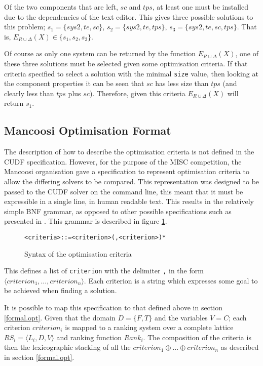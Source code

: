 Of the two components that are left, $sc$ and $tps$, at least one must be installed due to the dependencies of the text editor.
This gives three possible solutions to this problem;
$s_1 = \{sys2, te, sc\}$,
$s_2 = \{sys2, te, tps\}$,
$s_3 = \{sys2, te, sc, tps\}$.
That is, $E_{R \cup \Delta}(X) \in \{s_1,s_2,s_3\}$.

Of course as only one system can be returned by the function $E_{R \cup \Delta}(X)$, one of these three solutions must be selected given some optimisation criteria.
If that criteria specified to select a solution with the minimal \verb+size+ value, 
then looking at the component properties it can be seen that $sc$ has less size than $tps$ (and clearly less than $tps$ plus $sc$).
Therefore, given this criteria $E_{R \cup \Delta}(X)$ will return  $s_1$.

\subsection{Mancoosi Optimisation Format}
The description of how to describe the optimisation criteria is not defined in the CUDF specification.
However, for the purpose of the MISC competition, 
the Mancoosi organisation gave a specification to represent optimisation criteria to allow the differing solvers to be compared.
This representation was designed to be passed to the CUDF solver on the command line, this meant that it must be expressible in a single line, in human readable text.
This results in the relatively simple BNF grammar, as opposed to other possible specifications such as presented in \cite{treinen2009}. 
This grammar is described in figure \ref{formal.optbnf}.

\begin{figure}[h!]
\begin{center}
\begin{alltt}
<criteria> ::= <criterion> (, <criterion>)*
\end{alltt}
  \caption{Syntax of the optimisation criteria}
  \label{formal.optbnf}
\end{center}
\end{figure}

This defines a list of \verb+criterion+ with the delimiter \verb+,+ in the form $\langle criterion_1, \ldots, criterion_n \rangle$.
Each criterion is a string which expresses some goal to be achieved when finding a solution.

It is possible to map this specification to that defined above in section \ref{formal.opt}.
Given that the domain $D = \{F,T\}$ and the variables $V = C$;
each criterion $criterion_i$ is mapped to a ranking system over a complete lattice $RS_i = \langle L_i,D,V \rangle$
and ranking function $Rank_i$.
The composition of the criteria is then the lexicographic stacking of all the $criterion_1 \oplus \ldots \oplus criterion_n$ as described in section \ref{formal.opt}.

